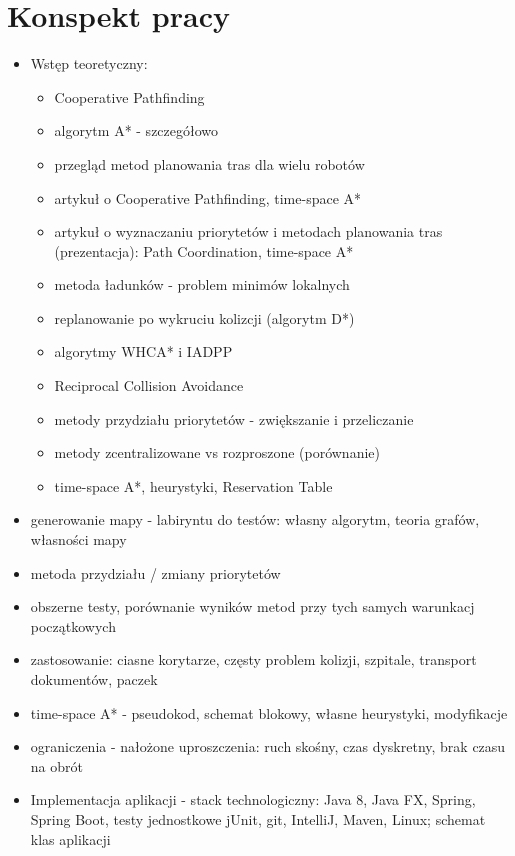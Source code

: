 \chapter{Konspekt pracy}
\label{ch:konspekt}
\begin{itemize}
	\item Wstęp teoretyczny:
	\begin{itemize}
		\item Cooperative Pathfinding
		\item algorytm A* - szczegółowo
		\item przegląd metod planowania tras dla wielu robotów
		\item artykuł o Cooperative Pathfinding, time-space A*
		\item artykuł o wyznaczaniu priorytetów i metodach planowania tras (prezentacja): Path Coordination, time-space A*
		\item metoda ładunków - problem minimów lokalnych
		\item replanowanie po wykruciu kolizcji (algorytm D*)
		\item algorytmy WHCA* i IADPP
		\item Reciprocal Collision Avoidance
		\item metody przydziału priorytetów - zwiększanie i przeliczanie
		\item metody zcentralizowane vs rozproszone (porównanie)
		\item time-space A*, heurystyki, Reservation Table
	\end{itemize}
	\item generowanie mapy - labiryntu do testów: własny algorytm, teoria grafów, własności mapy
	\item metoda przydziału / zmiany priorytetów
	\item obszerne testy, porównanie wyników metod przy tych samych warunkacj początkowych
	\item zastosowanie: ciasne korytarze, częsty problem kolizji, szpitale, transport dokumentów, paczek
	\item time-space A* - pseudokod, schemat blokowy, własne heurystyki, modyfikacje
	\item ograniczenia - nałożone uproszczenia: ruch skośny, czas dyskretny, brak czasu na obrót
	\item Implementacja aplikacji - stack technologiczny: Java 8, Java FX, Spring, Spring Boot, testy jednostkowe jUnit, git, IntelliJ, Maven, Linux; schemat klas aplikacji
\end{itemize}